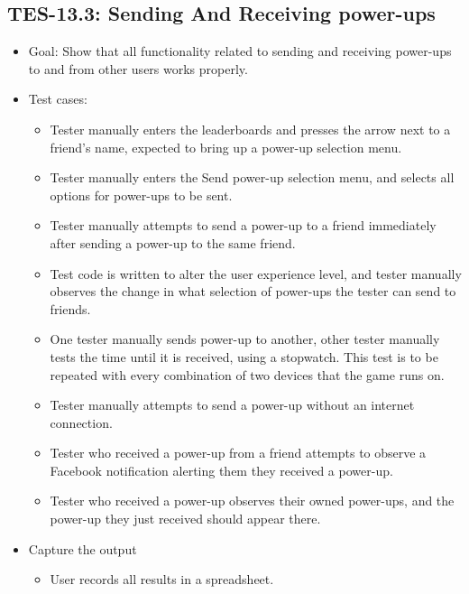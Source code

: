 \subsection{TES-13.3: Sending And Receiving power-ups }
\begin{itemize}
\item Goal: Show that all functionality related to sending and receiving power-ups to and from other users works properly.

\item Test cases: 
\begin{itemize}
\item Tester manually enters the leaderboards and presses the arrow next to a friend's name, expected to bring up a power-up selection menu.
\item Tester manually enters the Send power-up selection menu, and selects all options for power-ups to be sent.
\item Tester manually attempts to send a power-up to a friend immediately after sending a power-up to the same friend.
\item Test code is written to alter the user experience level, and tester manually observes the change in what selection of power-ups the tester can send to friends.
\item One tester manually sends power-up to another, other tester manually tests the time until it is received, using a stopwatch. This
test is to be repeated with every combination of two devices that the game runs on.
\item Tester manually attempts to send a power-up without an internet connection.
\item Tester who received a power-up from a friend attempts to observe a Facebook notification alerting them they received a power-up.
\item Tester who received a power-up observes their owned power-ups, and the power-up they just received should appear there.


\end{itemize}

\item Capture the output 
\begin{itemize}
\item User records all results in a spreadsheet.
\end{itemize}


\end{itemize}
